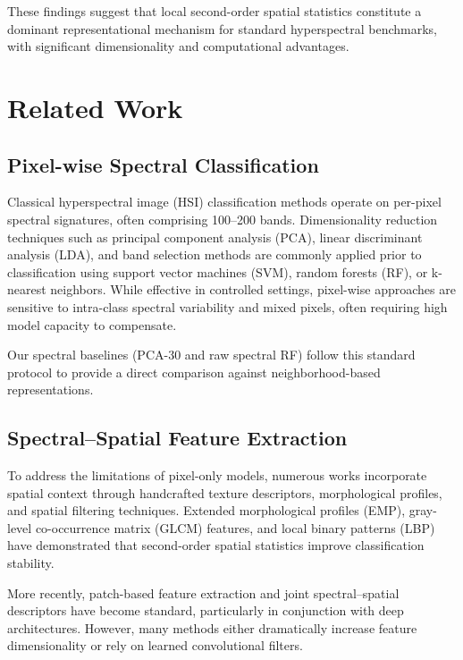 \documentclass[
  journal]{IEEEtran}
\begin{document}
These findings suggest that local second-order spatial statistics
constitute a dominant representational mechanism for standard
hyperspectral benchmarks, with significant dimensionality and
computational advantages.

\section{Related Work}\label{related-work}

\subsection{Pixel-wise Spectral
Classification}\label{pixel-wise-spectral-classification}

Classical hyperspectral image (HSI) classification methods operate on
per-pixel spectral signatures, often comprising 100--200 bands.
Dimensionality reduction techniques such as principal component analysis
(PCA), linear discriminant analysis (LDA), and band selection methods
are commonly applied prior to classification using support vector
machines (SVM), random forests (RF), or k-nearest neighbors. While
effective in controlled settings, pixel-wise approaches are sensitive to
intra-class spectral variability and mixed pixels, often requiring high
model capacity to compensate.

Our spectral baselines (PCA-30 and raw spectral RF) follow this standard
protocol to provide a direct comparison against neighborhood-based
representations.

\subsection{Spectral--Spatial Feature
Extraction}\label{spectralspatial-feature-extraction}

To address the limitations of pixel-only models, numerous works
incorporate spatial context through handcrafted texture descriptors,
morphological profiles, and spatial filtering techniques. Extended
morphological profiles (EMP), gray-level co-occurrence matrix (GLCM)
features, and local binary patterns (LBP) have demonstrated that
second-order spatial statistics improve classification stability.

More recently, patch-based feature extraction and joint
spectral--spatial descriptors have become standard, particularly in
conjunction with deep architectures. However, many methods either
dramatically increase feature dimensionality or rely on learned
convolutional filters.
\end{document}
